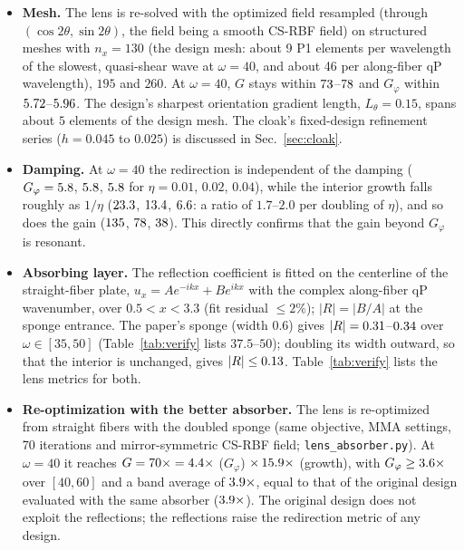 \begin{itemize}[itemsep=1pt]
\item \textbf{Mesh.} The lens is re-solved with the optimized field resampled (through
  $(\cos2\theta,\sin2\theta)$, the field being a smooth CS-RBF field) on structured meshes
  with $n_x=130$ (the design mesh: about 9 P1 elements per wavelength of the slowest,
  quasi-shear wave at $\omega=40$, and about 46 per along-fiber qP wavelength), $195$ and
  $260$. At $\omega=40$, $G$ stays within $73$--$78$
  and $G_\varphi$ within $5.72$--$5.96$. The design's sharpest orientation gradient length,
  $L_\theta=0.15$, spans about $5$ elements of the design mesh. The cloak's fixed-design refinement series
  ($h=0.045$ to $0.025$) is discussed in Sec.~\ref{sec:cloak}.
\item \textbf{Damping.} At $\omega=40$ the redirection is independent of the damping
  ($G_\varphi=5.8$, $5.8$, $5.8$ for $\eta=0.01$, $0.02$, $0.04$), while
  the interior growth falls roughly as $1/\eta$ ($23.3$, $13.4$, $6.6$: a ratio of $1.7$--$2.0$ per doubling of $\eta$), and so
  does the gain ($135$, $78$, $38$). This directly confirms that the
  gain beyond $G_\varphi$ is resonant.
\item \textbf{Absorbing layer.} The reflection coefficient is fitted on the centerline of
  the straight-fiber plate, $u_x=Ae^{-ikx}+Be^{ikx}$ with the complex along-fiber qP
  wavenumber, over $0.5<x<3.3$ (fit residual $\le2\%$); $|R|=|B/A|$ at the sponge entrance.
  The paper's sponge (width $0.6$) gives $|R|=0.31$--$0.34$ over
  $\omega\in[35,50]$ (Table~\ref{tab:verify} lists $37.5$--$50$); doubling its width outward, so that the interior is unchanged, gives
  $|R|\le0.13$. Table~\ref{tab:verify} lists the lens metrics for both.
\item \textbf{Re-optimization with the better absorber.} The lens is re-optimized from
  straight fibers with the doubled sponge (same objective, MMA settings, 70 iterations and
  mirror-symmetric CS-RBF field; \texttt{lens\_\allowbreak absorber.py}). At $\omega=40$ it
  reaches $G=70\times=4.4\times$ ($G_\varphi$) $\times\,15.9\times$ (growth), with
  $G_\varphi\ge3.6\times$ over $[40,60]$ and a band average of
  $3.9\times$, equal to that of the original design evaluated with the same absorber
  ($3.9\times$). The original design does not exploit the reflections; the
  reflections raise the redirection metric of any design.

\end{itemize}
